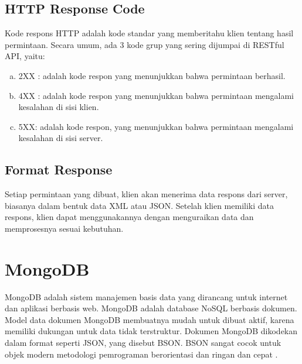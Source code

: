 	\subsection {HTTP Response Code}
	
	Kode respons HTTP adalah kode standar yang memberitahu klien tentang hasil permintaan. Secara umum, ada 3 kode grup yang sering dijumpai di RESTful API, yaitu:
	
	\begin{enumerate}[a.]
	
		\item 2XX : adalah kode respon yang menunjukkan bahwa permintaan berhasil.
		\item 4XX : adalah kode respon yang menunjukkan bahwa permintaan mengalami kesalahan di sisi klien.
		\item 5XX: adalah kode respon, yang menunjukkan bahwa permintaan mengalami kesalahan di sisi server.
	
	\end{enumerate}
	
    	\subsection {Format Response}
	
	Setiap permintaan yang dibuat, klien akan menerima data respons dari server, biasanya dalam bentuk data XML atau JSON. Setelah klien memiliki data respons, klien dapat menggunakannya dengan menguraikan data dan memprosesnya sesuai kebutuhan.
	
\section{MongoDB}

	MongoDB adalah sistem manajemen basis data yang dirancang untuk internet dan aplikasi berbasis web. MongoDB adalah database NoSQL berbasis dokumen. Model data dokumen MongoDB membuatnya mudah untuk dibuat aktif, karena memiliki dukungan untuk data tidak terstruktur. Dokumen MongoDB dikodekan dalam format seperti JSON, yang disebut BSON. BSON sangat cocok untuk objek modern metodologi pemrograman berorientasi dan ringan dan cepat \citep{hemakrishnan2016mongodb}.
	
